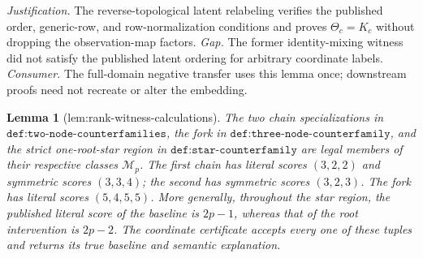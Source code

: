 \documentclass{article}
\newtheorem{lemma}{Lemma}
\begin{document}
\par\smallskip\noindent \textit{Justification.} The reverse-topological latent relabeling verifies the published order, generic-row, and row-normalization conditions and proves \(\Theta_c=K_c\) without dropping the observation-map factors. \textit{Gap.} The former identity-mixing witness did not satisfy the published latent ordering for arbitrary coordinate labels. \textit{Consumer.} The full-domain negative transfer uses this lemma once; downstream proofs need not recreate or alter the embedding.

\begin{lemma}[lem:rank-witness-calculations]\label{lem:rank-witness-calculations}
The two chain specializations in \(\texttt{def:two-node-counterfamilies}\), the fork in \(\texttt{def:three-node-counterfamily}\), and the strict one-root-star region in \(\texttt{def:star-counterfamily}\) are legal members of their respective classes \(\mathcal M_p\).  The first chain has literal scores \((3,2,2)\) and symmetric scores \((3,3,4)\); the second has symmetric scores \((3,2,3)\).  The fork has literal scores \((5,4,5,5)\).  More generally, throughout the star region, the published literal score of the baseline is \(2p-1\), whereas that of the root intervention is \(2p-2\).  The coordinate certificate accepts every one of these tuples and returns its true baseline and semantic explanation.
\end{lemma}
\end{document}
